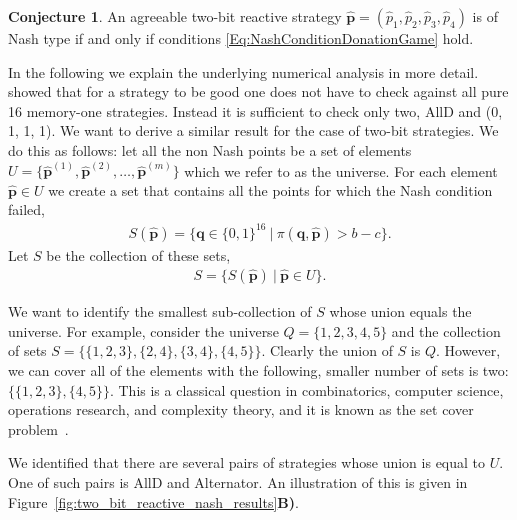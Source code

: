 \documentclass{article}
\theoremstyle{definition}
\newtheorem{conjecture}[theorem]{Conjecture}
\begin{document}
\begin{conjecture}\label{conjecture:nash_from_numerical_results}
An agreeable two-bit reactive strategy \(\mathbf{\hat{p}} = (\hat{p}_{1}, \hat{p}_{2}, \hat{p}_{3}, \hat{p}_{4})\) is of Nash type if and only if conditions \eqref{Eq:NashConditionDonationGame} hold. 
\end{conjecture}

In the following we explain the underlying numerical analysis in more detail. 
\citet{akin:EGADS:2016} showed that for a strategy to be good one does
not have to check against all pure 16 memory-one strategies. 
Instead it is sufficient to check only two, AllD and (0, 1, 1, 1). We want
to derive a similar result for the case of two-bit strategies. We do this as
follows: let all the non Nash points be a
set of elements \(U = \{ \mathbf{\hat{p}}^{(1)}, \mathbf{\hat{p}}^{(2)}, \dots,
\mathbf{\hat{p}}^{(m)}\}\) which we refer to as the universe. For each element $\mathbf{\hat{p}}\in U$
we create a set that contains all the points for which the Nash
condition failed,
 \begin{align*}
 S(\mathbf{\hat{p}}) = \{\mathbf{q}\in\{0,1\}^{16} \ | \ \pi( \mathbf{q},  \mathbf{\hat{p}}) > b\!-\!c\}.
 \end{align*}
Let \(S\) be the collection of these sets,
\begin{align*}
  S = \big\{S(\mathbf{\hat{p}}) \ | \ \mathbf{\hat{p}}\in U \big\}.
\end{align*}

We want to identify the smallest sub-collection of \(S\) whose union equals the
universe. For example, consider the universe \(Q = \{1, 2, 3, 4, 5\}\) and the
collection of sets \(S = \{ \{1, 2, 3\}, \{2, 4\}, \{3, 4\}, \{4, 5\} \}\).
Clearly the union of \(S\) is \(Q\). However, we can cover all of the elements
with the following, smaller number of sets is two: \(\{ \{1, 2, 3\}, \{4, 5\}
\}\). This is a classical question in combinatorics, computer science,
operations research, and complexity theory, and it is known as the set cover
problem~\citep{beasley:EJOR:1987}.

We identified that there are several pairs of strategies whose union is
equal to \(U\). One of such pairs is AllD and Alternator. An
illustration of this is
given in Figure~\ref{fig:two_bit_reactive_nash_results}\textbf{B)}.
\end{document}
